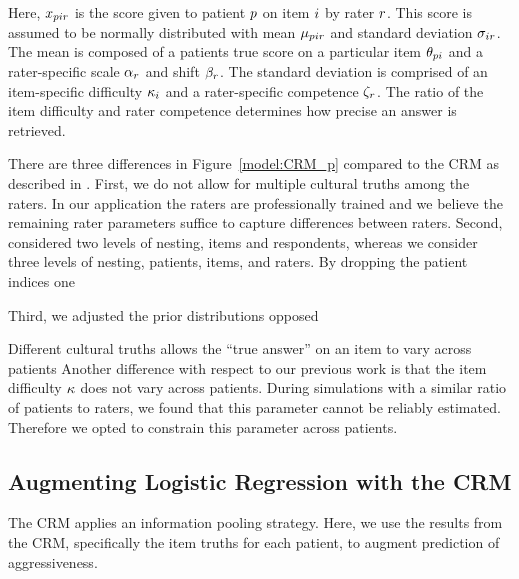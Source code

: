 \documentclass[a4paper,11pt]{article}
\begin{document}
Here, $x_{pir}$ is the score given to patient $p$ on item $i$ by rater $r$.
This score is assumed to be normally distributed with mean $\mu_{pir}$ and standard deviation $\sigma_{ir}$. 
The mean is composed of a patients true score on a particular item $\theta_{pi}$ and a rater-specific scale $\alpha_r$ and shift $\beta_r$.
The standard deviation is comprised of an item-specific difficulty $\kappa_i$ and a rater-specific competence $\zeta_r$.
The ratio of the item difficulty and rater competence determines how precise an answer is retrieved.

There are three differences in Figure~\ref{model:CRM_p} compared to the CRM as described in \textcite{anders2014cultural}. 
First, we do not allow for multiple cultural truths among the raters.
In our application the raters are professionally trained and we believe the remaining rater parameters suffice to capture differences between raters.
Second, \parencite{anders2014cultural} considered two levels of nesting, items and respondents, whereas we consider three levels of nesting, patients, items, and raters.
By dropping the patient indices one 

Third, we adjusted the prior distributions opposed


Different cultural truths allows the ``true answer'' on an item to vary across patients
Another difference with respect to our previous work \parencite{vandenBergh2020cultural} is that the item difficulty $\kappa$ does not vary across patients.
During simulations with a similar ratio of patients to raters, we found that this parameter cannot be reliably estimated.
Therefore we opted to constrain this parameter across patients.

\subsection{Augmenting Logistic Regression with the CRM}
The CRM applies an information pooling strategy. Here, we use the results from the CRM, specifically the item truths for each patient, to augment prediction of aggressiveness.
\end{document}
